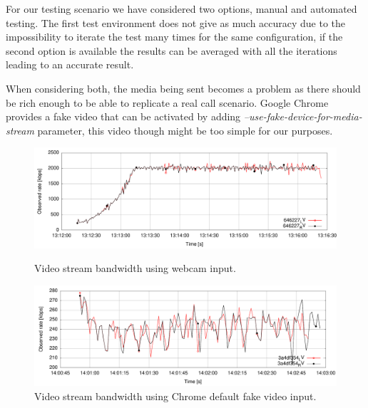 For our testing scenario we have considered two options, manual and automated testing. The first test environment does not give as much accuracy due to the impossibility to iterate the test many times for the same configuration, if the second option is available the results can be averaged with all the iterations leading to an accurate result.

When considering both, the media being sent becomes a problem as there should be rich enough to be able to replicate a real call scenario. Google Chrome provides a fake video that can be activated by adding {\it --use-fake-device-for-media-stream} parameter, this video though might be too simple for our purposes.


 \begin{figure}[h]
  \centering
   \includegraphics[width=1\textwidth]{./figures/realVideoChrome.pdf}
     \caption[Video stream bandwidth using webcam]{Video stream bandwidth using webcam input.}
	\label{fig:realVideoChrome}
  \centering
	\includegraphics[width=1\textwidth]{./figures/automatedVideoChrome.pdf}
	\caption[Video stream bandwidth using Chrome default fake content]{Video stream bandwidth using Chrome default fake video input.}
	\label{fig:automatedVideoChrome}
\end{figure}

